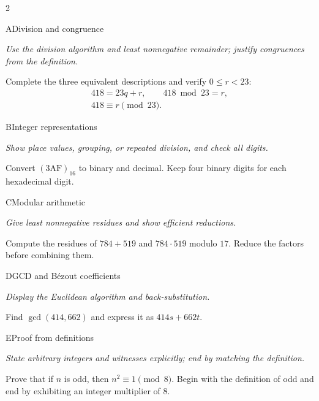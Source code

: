 \documentclass[9pt]{extarticle}
\begin{document}
\begin{multicols}{2}
\begin{CoreProblem}{A}{Division and congruence}
{\scriptsize\textit{Use the division algorithm and least nonnegative remainder; justify congruences from the definition.}\par}
Complete the three equivalent descriptions and verify $0\le r<23$:
\[
\begin{gathered}
418=23q+r,\qquad 418\bmod 23=r,\\
418\equiv r\pmod{23}.
\end{gathered}
\]
\end{CoreProblem}
\begin{CoreProblem}{B}{Integer representations}
{\scriptsize\textit{Show place values, grouping, or repeated division, and check all digits.}\par}
Convert $(\mathrm{3AF})_{16}$ to binary and decimal. Keep four binary digits
for each hexadecimal digit.
\end{CoreProblem}
\begin{CoreProblem}{C}{Modular arithmetic}
{\scriptsize\textit{Give least nonnegative residues and show efficient reductions.}\par}
Compute the residues of $784+519$ and $784\cdot519$ modulo $17$. Reduce the
factors before combining them.
\end{CoreProblem}
\columnbreak
\begin{CoreProblem}{D}{GCD and B\'ezout coefficients}
{\scriptsize\textit{Display the Euclidean algorithm and back-substitution.}\par}
Find $\gcd(414,662)$ and express it as $414s+662t$.
\end{CoreProblem}
\begin{CoreProblem}{E}{Proof from definitions}
{\scriptsize\textit{State arbitrary integers and witnesses explicitly; end by matching the definition.}\par}
Prove that if $n$ is odd, then $n^2\equiv1\pmod{8}$. Begin with the definition
of odd and end by exhibiting an integer multiplier of $8$.
\end{CoreProblem}
\end{multicols}
\CoreWorkArea
\FormBreak
{}
\end{document}
